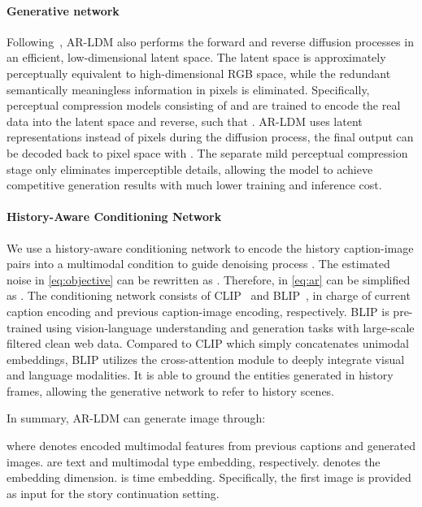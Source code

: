 \documentclass[10pt,twocolumn,letterpaper]{article}
\begin{document}
\paragraph{Generative network}
Following~\cite{ldm}, AR-LDM also performs the forward and reverse diffusion processes in an efficient, low-dimensional latent space. The latent space is approximately perceptually equivalent to high-dimensional RGB space, while the redundant semantically meaningless information in pixels is eliminated. Specifically, perceptual compression models consisting of  and  are trained to encode the real data into the latent space and reverse, such that . AR-LDM uses latent representations  instead of pixels during the diffusion process, the final output can be decoded back to pixel space with . The separate mild perceptual compression stage only eliminates imperceptible details, allowing the model to achieve competitive generation results with much lower training and inference cost.

\paragraph{History-Aware Conditioning Network}
We use a history-aware conditioning network to encode the history caption-image pairs into a multimodal condition  to guide denoising process . The estimated noise in \cref{eq:objective} can be rewritten as . Therefore,  in \cref{eq:ar} can be simplified as . The conditioning network consists of CLIP~\cite{clip} and BLIP~\cite{blip}, in charge of current caption encoding and previous caption-image encoding, respectively. BLIP is pre-trained using vision-language understanding and generation tasks with large-scale filtered clean web data. Compared to CLIP which simply concatenates unimodal embeddings, BLIP utilizes the cross-attention module to deeply integrate visual and language modalities. It is able to ground the entities generated in history frames, allowing the generative network to refer to history scenes.

In summary, AR-LDM can generate image  through:

where  denotes encoded multimodal features from previous captions and generated images.  are text and multimodal type embedding, respectively.  denotes the embedding dimension.  is time embedding. Specifically, the first image  is provided as input for the story continuation setting.
\end{document}
